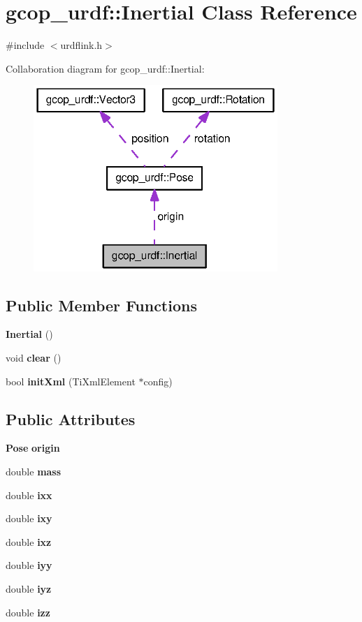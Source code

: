 \section{gcop\-\_\-urdf\-:\-:\-Inertial \-Class \-Reference}
\label{classgcop__urdf_1_1Inertial}


{\ttfamily \#include $<$urdflink.\-h$>$}



\-Collaboration diagram for gcop\-\_\-urdf\-:\-:\-Inertial\-:
\nopagebreak
\begin{figure}[H]
\begin{center}
\leavevmode
\includegraphics[width=262pt]{classgcop__urdf_1_1Inertial__coll__graph}
\end{center}
\end{figure}
\subsection*{\-Public \-Member \-Functions}
\begin{DoxyCompactItemize}
\item 
{\bf \-Inertial} ()
\item 
void {\bf clear} ()
\item 
bool {\bf init\-Xml} (\-Ti\-Xml\-Element $\ast$config)
\end{DoxyCompactItemize}
\subsection*{\-Public \-Attributes}
\begin{DoxyCompactItemize}
\item 
{\bf \-Pose} {\bf origin}
\item 
double {\bf mass}
\item 
double {\bf ixx}
\item 
double {\bf ixy}
\item 
double {\bf ixz}
\item 
double {\bf iyy}
\item 
double {\bf iyz}
\item 
double {\bf izz}
\end{DoxyCompactItemize}


